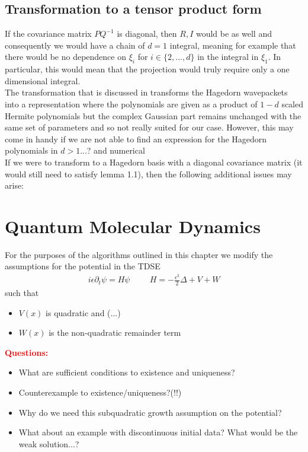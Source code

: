 \subsection{Transformation to a tensor product form}
If the covariance matrix $PQ^{-1}$ is diagonal, then $R,I$ would be as 
well and consequently we would have a chain of $d=1$ integral, meaning for 
example that there would be no dependence on $\xi_{i}$ for $i \in \{2,...,d \}$
in the integral in $\xi_1$. In particular, this would mean that the projection 
would truly require only a one dimensional integral. 
\\
The transformation that is discussed in \cite{hagedornSymmetricKroneckerProducts2017}
transforms the Hagedorn wavepackets into a representation where the polynomials are given 
as a product of $1-d$ scaled Hermite polynomials but the complex Gaussian part remains unchanged 
with the same set of parameters and so not really suited for our case. However, this may come 
in handy if we are not able to find an expression for the Hagedorn polynomials in $d>1$...?
and numerical 
\\
If we were to transform to a Hagedorn basis with a diagonal covariance matrix (it would 
still need to satisfy lemma 1.1), then the following additional issues may arise:

    \section{Quantum Molecular Dynamics}
    For the purposes of the algorithms outlined in 
    this chapter we modify the assumptions for 
    the potential in the TDSE 
    \cite{schrodingerUndulatoryTheoryMechanics1926b}
    \begin{align}
          i\epsilon \partial_t \psi = H \psi \hspace{1cm}
          H = -\frac{\epsilon^2}{2}\Delta + V + W
          \label{Schrodinger}
    \end{align}
    such that  
    \begin{itemize}
      \item $V(x)$ is quadratic and (...)
      \item $W(x)$ is the non-quadratic remainder term
    \end{itemize}
    \textcolor{red}{\textbf{Questions:}}
    \begin{itemize}
      \item What are sufficient conditions to existence and uniqueness?
      \item Counterexample to existence/uniqueness?(!!)
      \item Why do we need this subquadratic growth assumption on the 
        potential?
      \item What about an example with discontinuous initial data?
        What would be the weak solution...?
    \end{itemize}

